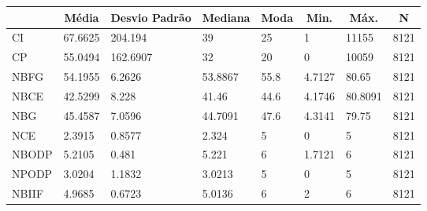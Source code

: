 \begin{table}[!htbp]
\centering
\begin{tabular}{@{}llllllll@{}}
\toprule
      & \multicolumn{1}{c}{Média} & \multicolumn{1}{c}{Desvio Padrão} & \multicolumn{1}{c}{Mediana} & \multicolumn{1}{c}{Moda} & \multicolumn{1}{c}{Min.} & \multicolumn{1}{c}{Máx.} & \multicolumn{1}{c}{N} \\ \midrule
CI    & 67.6625                   & 204.194                           & 39                          & 25                       & 1                        & 11155                    & 8121                  \\
CP    & 55.0494                   & 162.6907                          & 32                          & 20                       & 0                        & 10059                    & 8121                  \\
NBFG  & 54.1955                   & 6.2626                            & 53.8867                     & 55.8                     & 4.7127                   & 80.65                    & 8121                  \\
NBCE  & 42.5299                   & 8.228                             & 41.46                       & 44.6                     & 4.1746                   & 80.8091                  & 8121                  \\
NBG   & 45.4587                   & 7.0596                            & 44.7091                     & 47.6                     & 4.3141                   & 79.75                    & 8121                  \\
NCE   & 2.3915                    & 0.8577                            & 2.324                       & 5                        & 0                        & 5                        & 8121                  \\
NBODP & 5.2105                    & 0.481                             & 5.221                       & 6                        & 1.7121                   & 6                        & 8121                  \\
NPODP & 3.0204                    & 1.1832                            & 3.0213                      & 5                        & 0                        & 5                        & 8121                  \\
NBIIF & 4.9685                    & 0.6723                            & 5.0136                      & 6                        & 2                        & 6                        & 8121                  \\

\end{tabular}
\end{table}
